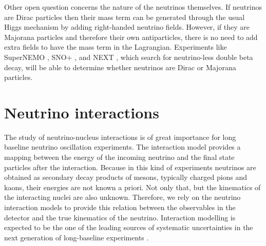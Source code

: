 Other open question concerns the nature of the neutrinos themselves. If neutrinos are Dirac particles then their mass term can be generated through the usual Higgs mechanism by adding right-handed neutrino fields. However, if they are Majorana particles and therefore their own antiparticles, there is no need to add extra fields to have the mass term in the Lagrangian. Experiments like SuperNEMO \cite{SuperNEMO2010}, SNO+ \cite{SNO2015}, and NEXT \cite{NEXT2020}, which search for neutrino-less double beta decay, will be able to determine whether neutrinos are Dirac or Majorana particles.

\section{Neutrino interactions}\label{sec:nu_interactions}

The study of neutrino-nucleus interactions is of great importance for long baseline neutrino oscillation experiments. The interaction model provides a mapping between the energy of the incoming neutrino and the final state particles after the interaction. Because in this kind of experiments neutrinos are obtained as secondary decay products of mesons, typically charged pions and kaons, their energies are not known a priori. Not only that, but the kinematics of the interacting nuclei are also unknown. Therefore, we rely on the neutrino interaction models to provide this relation between the observables in the detector and the true kinematics of the neutrino. Interaction modelling is expected to be the one of the leading sources of systematic uncertainties in the next generation of long-baseline experiments \cite{Coloma2013,Coloma2013a,Mosel2016}.

